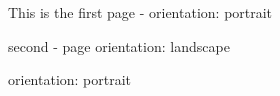 \documentclass{article}
\begin{document}
This is the first page  - orientation: portrait


second - page orientation: landscape

\restoregeometry

orientation: portrait
\end{document}
